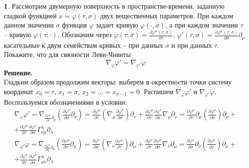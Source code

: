 \documentclass[12pt]{article}
\theoremstyle{definition}
\newtheorem{zad}{}[section]
\begin{document}
\begin{zad}
Рассмотрим двумерную поверхность в пространстве-времени, заданную гладкой функцией $x=\varphi(\tau,\sigma)$ двух вещественных параметров. При каждом данном значении $\sigma$ функция $\varphi$ задает кривую $\varphi(\cdot,\sigma)$, а при каждом значении $\tau$ -- кривую $\varphi(\tau,\cdot)$. Обозначим через $\dot{\varphi}(\tau,\sigma)=\frac{\partial\varphi^\mu(\tau,\sigma)}{\partial\tau}$, $\varphi'(\tau,\sigma)=\frac{\partial\varphi^\mu(\tau,\sigma)}{\partial\sigma}\partial_\mu$ касательные к двум семействам кривых -- при данных $\sigma$ и при данных $\tau$. Покажите, что для связности Леви-Чивиты
\begin{equation}
    \nabla_{\dot{\varphi}}\varphi'=\nabla_{\varphi'}\dot{\varphi}
\end{equation}
\textbf{Решение.}\\
Гладким образом продолжим векторы: выберем в окрестности точки систему координат $x_0=\tau$, $x_1=\sigma$, $x_2=...=x_{d-1}=0$. 
Распишем $\nabla_{\dot{\varphi}}\varphi'$ и $\nabla_{\varphi'}\dot{\varphi}$. Воспользуемся обозначениями в условии:
\begin{multline}\label{eq4}
    \nabla_{\dot{\varphi}}\varphi'=\nabla_{\frac{\partial \varphi^\mu}{\partial\tau}\partial_\mu}\left(\frac{\partial\varphi^\nu}{\partial\sigma}\partial_\nu\right)=\frac{\partial \varphi^\mu}{\partial\tau}\left(\nabla_\mu\frac{\partial\varphi^\nu}{\partial\sigma}\right)\partial_\nu+\frac{\partial \varphi^\mu}{\partial\tau}\frac{\partial\varphi^\nu}{\partial\sigma}\nabla_\mu\partial_\nu=\frac{\partial \varphi^\mu}{\partial\tau}\partial_\mu\left(\frac{\partial\varphi^\nu}{\partial\sigma}\right)\partial_\nu+\\+\frac{\partial \varphi^\mu}{\partial\tau}\frac{\partial\varphi^\nu}{\partial\sigma}\Gamma^\lambda_{\nu\mu}\partial_\lambda
\end{multline}
\begin{multline}\label{eq5}
    \nabla_{\varphi'}\dot{\varphi}=\nabla_{\frac{\partial \varphi^\nu}{\partial\sigma}\partial_\nu}\left(\frac{\partial\varphi^\mu}{\partial\tau}\partial_\mu\right)=\frac{\partial \varphi^\nu}{\partial\sigma}\left(\nabla_\nu\frac{\partial\varphi^\mu}{\partial\tau}\right)\partial_\mu+\frac{\partial \varphi^\nu}{\partial\tau}\frac{\partial\varphi^\mu}{\partial\sigma}\nabla_\nu\partial_\mu=\frac{\partial \varphi^\nu}{\partial\sigma}\partial_\nu\left(\frac{\partial\varphi^\mu}{\partial\tau}\right)\partial_\mu+\\+\frac{\partial \varphi^\nu}{\partial\tau}\frac{\partial\varphi^\mu}{\partial\sigma}\Gamma^\lambda_{\mu\nu}\partial_\lambda

\end{multline}
\end{zad}
\end{document}
